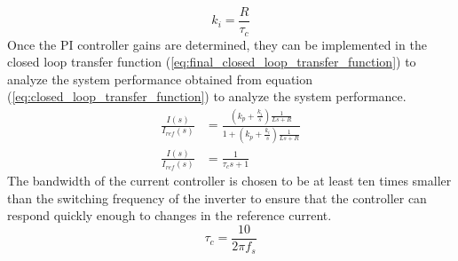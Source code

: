 \begin{equation}
    k_{i} = \frac{R}{\tau_c}
    \label{eq:final_ki}
\end{equation}
Once the PI controller gains are determined, they can be implemented in the closed loop transfer function
(\ref{eq:final_closed_loop_transfer_function}) to analyze the system performance obtained from equation
(\ref{eq:closed_loop_transfer_function}) to analyze the system performance.
\begin{equation}
    \begin{split}
        \frac{I(s)}{I_{ref}(s)} &=  \frac{(k_{p} + \frac{k_{i}}{s}) \frac{1}{Ls + R}}{1 + (k_{p} + \frac{k_{i}}{s}) \frac{1}{Ls + R}} \\
        \frac{I(s)}{I_{ref}(s)} &= \frac{1}{\tau_c s + 1}
    \end{split}
    \label{eq:final_closed_loop_transfer_function}
\end{equation}
The bandwidth of the current controller is chosen to be at least ten times smaller than the
switching frequency of the inverter to ensure that the controller can respond quickly enough to
changes in the reference current\cite{artWangMPC}.
\begin{equation}
    \tau_c = \frac{10}{2 \pi f_{s}}
    \label{eq:time_constant_bandwidth}
\end{equation}

